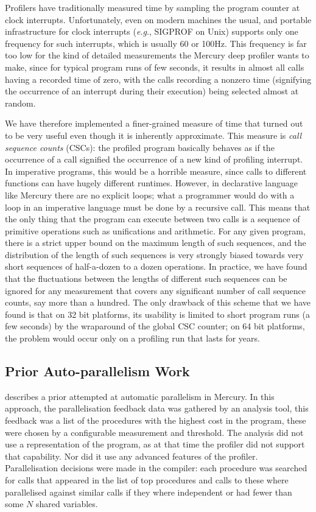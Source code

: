 Profilers have traditionally measured time
by sampling the program counter at clock interrupts.
Unfortunately, even on modern machines
the usual, and portable infrastructure for clock interrupts
(\emph{e.g}., SIGPROF on Unix)
supports only one frequency for such interrupts,
which is usually 60 or 100Hz.
This frequency is far too low for the kind of detailed measurements
the Mercury deep profiler wants to make,
since for typical program runs of few seconds,
it results in almost all calls having a recorded time of zero,
with the calls recording a nonzero time
(signifying the occurrence of an interrupt during their execution)
being selected almost at random.

We have therefore implemented a finer-grained measure of time
that turned out to be very useful
even though it is inherently approximate.
This measure is \emph{call sequence counts} (CSCs):
the profiled program basically behaves
as if the occurrence of a call signified
the occurrence of a new kind of profiling interrupt.
In imperative programs, this would be a horrible measure,
since calls to different functions can have hugely different runtimes.
However, in declarative language like Mercury there are no explicit loops;
what a programmer would do with a loop in an imperative language
must be done by a recursive call.
This means that the only thing that the program can execute between two calls
is a sequence of primitive operations such as unifications and arithmetic.
For any given program,
there is a strict upper bound on the maximum length of such sequences,
and the distribution of the length of such sequences
is very strongly biased towards very short sequences
of half-a-dozen to a dozen operations.
In practice, we have found that
the fluctuations between the lengths of different such sequences
can be ignored for any measurement
that covers any significant number of call sequence counts,
say more than a hundred.
The only drawback of this scheme that we have found
is that on 32 bit platforms,
its usability is limited to short program runs (a few seconds)
by the wraparound of the global CSC counter;
on 64 bit platforms, the problem would occur
only on a profiling run that lasts for years.

\subsection{Prior Auto-parallelism Work}

\citet{tannier:2007:parallel_mercury} describes a prior attempted at automatic
parallelism in Mercury.
In this approach, the parallelisation feedback data was gathered by an analysis
tool,
this feedback was a list of the procedures with the highest cost in the program,
these were chosen by a configurable measurement and threshold.
The analysis did not use a representation of the program,
as at that time the profiler did not support that capability.
Nor did it use any advanced features of the profiler.
Parallelisation decisions were made in the compiler:
each procedure was searched for calls that appeared in the list of top procedures
and calls to these where parallelised against similar calls if they
where independent or had fewer than some $N$ shared variables.

